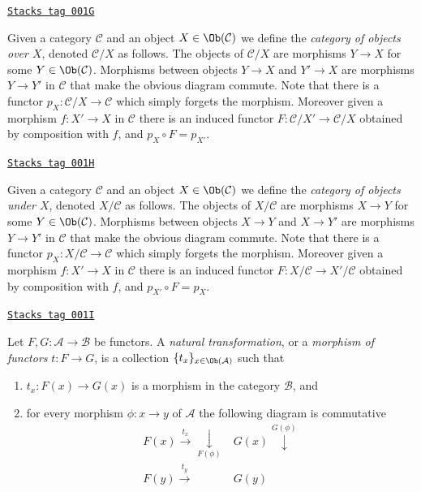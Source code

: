 \begin{example}
\label{categories-example-category-over-X}
\href{https://stacks.math.columbia.edu/tag/001G}{\texttt{Stacks tag 001G}}

Given a category $\mathcal{C}$ and an object $X\in \Ob(\mathcal{C})$
we define the {\it category of objects over $X$},
denoted $\mathcal{C}/X$ as follows.
The objects of $\mathcal{C}/X$ are morphisms $Y\to X$ for
some $Y\in \Ob(\mathcal{C})$. Morphisms between objects
$Y\to X$ and $Y'\to X$ are morphisms $Y\to Y'$ in $\mathcal{C}$ that
make the obvious diagram commute. Note that there is a functor
$p_X : \mathcal{C}/X\to \mathcal{C}$ which simply forgets the
morphism. Moreover given a morphism $f : X'\to X$ in
$\mathcal{C}$ there is an induced functor
$F : \mathcal{C}/X' \to \mathcal{C}/X$ obtained by composition with $f$,
and $p_X\circ F = p_{X'}$.
\end{example}

\begin{example}
\label{categories-example-category-under-X}
\href{https://stacks.math.columbia.edu/tag/001H}{\texttt{Stacks tag 001H}}

Given a category $\mathcal{C}$ and an object $X\in \Ob(\mathcal{C})$
we define the {\it category of objects under $X$},
denoted $X/\mathcal{C}$ as follows.
The objects of $X/\mathcal{C}$ are morphisms $X\to Y$ for
some $Y\in \Ob(\mathcal{C})$. Morphisms between objects
$X\to Y$ and $X\to Y'$ are morphisms $Y\to Y'$ in $\mathcal{C}$ that
make the obvious diagram commute. Note that there is a functor
$p_X : X/\mathcal{C}\to \mathcal{C}$ which simply forgets the
morphism. Moreover given a morphism $f : X'\to X$ in
$\mathcal{C}$ there is an induced functor
$F : X/\mathcal{C} \to X'/\mathcal{C}$
obtained by composition with $f$,
and $p_{X'}\circ F = p_X$.
\end{example}


\begin{definition}
\label{categories-definition-transformation-functors}
\href{https://stacks.math.columbia.edu/tag/001I}{\texttt{Stacks tag 001I}}

Let $F, G : \mathcal{A} \to \mathcal{B}$ be functors.
A {\it natural transformation}, or a {\it morphism of functors}
$t : F \to G$, is a collection $\{t_x\}_{x\in \Ob(\mathcal{A})}$
such that
\begin{enumerate}
\item $t_x : F(x) \to G(x)$ is a morphism in the category $\mathcal{B}$, and
\item for every morphism $\phi : x \to y$ of $\mathcal{A}$ the following
diagram is commutative
$$
\begin{array}{cc}F(x) \overset{t_x}{\longrightarrow}\underset{F(\phi)}{\downarrow} & G(x) \overset{G(\phi)}{\downarrow} \\ F(y) \overset{t_y}{\longrightarrow} & G(y)\end{array}
$$
\end{enumerate}
\end{definition}

